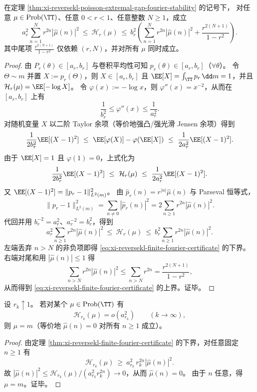 \begin{theorem}\label{thm:xi-reversekl-finite-fourier-certificate}
在定理 \ref{thm:xi-reversekl-poisson-extremal-gap-fourier-stability} 的记号下，
对任意 \(\mu\in\mathrm{Prob}(\TT)\)、任意 \(0<r<1\)、任意整数 \(N\ge 1\)，成立
\begin{equation}\label{eq:xi-reversekl-finite-fourier-certificate}
\boxed{\;
a_r^{2}\sum_{n=1}^{N} r^{2n}|\widehat\mu(n)|^2
\ \le\
\mathcal H_r(\mu)
\ \le\
b_r^{2}\left(\sum_{n=1}^{N} r^{2n}|\widehat\mu(n)|^2+\frac{r^{2(N+1)}}{1-r^2}\right).\;}
\end{equation}
其中尾项 \(\frac{r^{2(N+1)}}{1-r^2}\) 仅依赖 \((r,N)\)，并对所有 \(\mu\) 同时成立。
\end{theorem}
\begin{proof}
由 \(P_r(\theta)\in[a_r,b_r]\) 与卷积平均性可知 \(p_r(\theta)\in[a_r,b_r]\)（\(\forall\theta\)）。
令 \(\Theta\sim m\) 并置 \(X:=p_r(\Theta)\)，则 \(X\in[a_r,b_r]\) 且 \(\EE[X]=\int_{\TT}p_r\,\dd m=1\)，并且
\(\mathcal H_r(\mu)=\EE[-\log X]\)。
令 \(\varphi(x):=-\log x\)，则 \(\varphi''(x)=x^{-2}\)，从而在 \([a_r,b_r]\) 上有
\[
\frac{1}{b_r^2}\le \varphi''(x)\le \frac{1}{a_r^2}.
\]
对随机变量 \(X\) 以二阶 Taylor 余项（等价地强凸/强光滑 Jensen 余项）得到
\[
\frac{1}{2b_r^{2}}\EE[(X-1)^2]\ \le\ \EE[\varphi(X)]-\varphi(\EE[X])\ \le\ \frac{1}{2a_r^{2}}\EE[(X-1)^2].
\]
由于 \(\EE[X]=1\) 且 \(\varphi(1)=0\)，上式化为
\[
\frac{1}{2b_r^{2}}\EE[(X-1)^2]\ \le\ \mathcal H_r(\mu)\ \le\ \frac{1}{2a_r^{2}}\EE[(X-1)^2].
\]
又 \(\EE[(X-1)^2]=\|p_r-1\|_{L^2(m)}^2\)。
由 \(\widehat p_r(n)=r^{|n|}\widehat\mu(n)\) 与 Parseval 恒等式，
\[
\|p_r-1\|_{L^2(m)}^2=\sum_{n\neq 0}|\widehat p_r(n)|^2
=2\sum_{n\ge 1}r^{2n}|\widehat\mu(n)|^2.
\]
代回并用 \(b_r^{-2}=a_r^2\)、\(a_r^{-2}=b_r^2\)，得到
\[
a_r^2\sum_{n\ge 1}r^{2n}|\widehat\mu(n)|^2\ \le\ \mathcal H_r(\mu)\ \le\ b_r^2\sum_{n\ge 1}r^{2n}|\widehat\mu(n)|^2.
\]
左端丢弃 \(n>N\) 的非负项即得 \eqref{eq:xi-reversekl-finite-fourier-certificate} 的下界。
右端对尾和用 \(|\widehat\mu(n)|\le 1\) 得
\[
\sum_{n>N}r^{2n}|\widehat\mu(n)|^2\le \sum_{n>N}r^{2n}=\frac{r^{2(N+1)}}{1-r^2},
\]
从而得到 \eqref{eq:xi-reversekl-finite-fourier-certificate} 的上界。证毕。
\end{proof}



\begin{corollary}\label{cor:xi-reversekl-critical-rigidity-haar}
设 \(r_k\uparrow 1\)。
若对某个 \(\mu\in\mathrm{Prob}(\TT)\) 有
\[
\mathcal H_{r_k}(\mu)=o\!\left(a_{r_k}^2\right)\qquad(k\to\infty),
\]
则 \(\mu=m\)（等价地 \(\widehat\mu(n)=0\) 对所有 \(n\ge 1\) 成立）。
\end{corollary}
\begin{proof}
由定理 \ref{thm:xi-reversekl-finite-fourier-certificate} 的下界，对任意固定 \(n\ge 1\) 有
\[
\mathcal H_{r_k}(\mu)\ \ge\ a_{r_k}^2\,r_k^{2n}|\widehat\mu(n)|^2.
\]
故
\(
|\widehat\mu(n)|^2\le \mathcal H_{r_k}(\mu)/(a_{r_k}^2 r_k^{2n})\to 0
\)，从而 \(\widehat\mu(n)=0\)。
由于 \(n\) 任意，得 \(\mu=m\)。证毕。
\end{proof}

